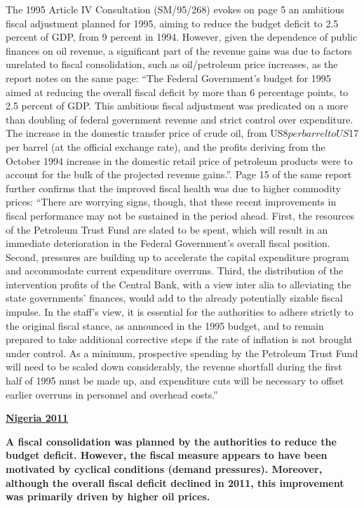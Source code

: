 The 1995 Article IV Consultation (SM/95/268) evokes on page 5 an ambitious fiscal adjustment planned for 1995, aiming to reduce the budget deficit to 2.5 percent of GDP, from 9 percent in 1994. However, given the dependence of public finances on oil revenue, a significant part of the revenue gains was due to factors unrelated to fiscal consolidation, such as oil/petroleum price increases, as the report notes on the same page: “The Federal Government’s budget for 1995 aimed at reducing the overall fiscal deficit by more than 6 percentage points, to 2.5 percent of GDP. This ambitious fiscal adjustment was predicated on a more than doubling of federal government revenue and strict control over expenditure. The increase in the domestic transfer price of crude oil, from US$8 per barrel to US$17 per barrel (at the official exchange rate), and the profits deriving from the October 1994 increase in the domestic retail price of petroleum products were to account for the bulk of the projected revenue gains.”. Page 15 of the same report further confirms that the improved fiscal health was due to higher commodity prices: “There are worrying signs, though, that these recent improvements in fiscal performance may not be sustained in the period ahead. First, the resources of the Petroleum Trust Fund are slated to be spent, which will result in an immediate deterioration in the Federal Government's overall fiscal position. Second, pressures are building up to accelerate the capital expenditure program and accommodate current expenditure overruns. Third, the distribution of the intervention profits of the Central Bank, with a view inter alia to alleviating the state governments' finances, would add to the already potentially sizable fiscal impulse. In the staff's view, it is essential for the authorities to adhere strictly to the original fiscal stance, as announced in the 1995 budget, and to remain prepared to take additional corrective steps if the rate of inflation is not brought under control. As a minimum, prospective spending by the Petroleum Trust Fund will need to be scaled down considerably, the revenue shortfall during the first half of 1995 must be made up, and expenditure cuts will be necessary to offset earlier overruns in personnel and overhead costs.”

\textbf{\underline{Nigeria 2011}}

\textbf{A fiscal consolidation was planned by the authorities to reduce the budget deficit. However, the fiscal measure appears to have been motivated by cyclical conditions (demand pressures). Moreover, although the overall fiscal deficit declined in 2011, this improvement was primarily driven by higher oil prices.}

